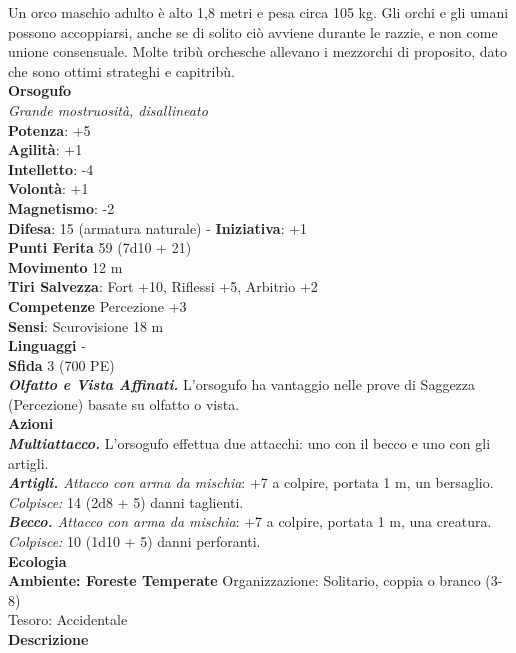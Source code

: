 \begin{multicols}{2}
Un orco maschio adulto è alto 1,8 metri e pesa circa 105 kg. Gli orchi e gli umani possono accoppiarsi, anche se di solito ciò avviene durante le razzie, e non come unione consensuale. Molte tribù orchesche allevano i mezzorchi di proposito, dato che sono ottimi strateghi e capitribù.\\


\medskip\textbf{Orsogufo}\\
\emph{Grande mostruosità, disallineato}\\
\textbf{Potenza}: +5\\
\textbf{Agilità}: +1\\
\textbf{Intelletto}: -4\\
\textbf{Volontà}: +1\\
\textbf{Magnetismo}: -2\\
\textbf{Difesa}: 15 (armatura naturale) - \textbf{Iniziativa}: +1\\
\textbf{Punti Ferita} 59 (7d10 + 21)\\
\textbf{Movimento} 12 m\\
\textbf{Tiri Salvezza}: Fort +10, Riflessi +5, Arbitrio +2\\
\textbf{Competenze} Percezione +3\\
\textbf{Sensi}: Scurovisione 18 m\\
\textbf{Linguaggi} -\\
\textbf{Sfida} 3 (700 PE)\smallskip\\
\emph{\textbf{Olfatto e Vista Affinati.}} L'orsogufo ha vantaggio nelle prove di Saggezza (Percezione) basate su olfatto o vista.\\
\smallskip\textbf{Azioni}\\
\emph{\textbf{Multiattacco.}} L'orsogufo effettua due attacchi: uno con il becco e uno con gli artigli.\\
\emph{\textbf{Artigli.} Attacco con arma da mischia}: +7 a colpire, portata 1 m, un bersaglio.\\
\emph{Colpisce:} 14 (2d8 + 5) danni taglienti.\\
\emph{\textbf{Becco.} Attacco con arma da mischia}: +7 a colpire, portata 1 m, una creatura.\\
\emph{Colpisce:} 10 (1d10 + 5) danni perforanti.\\
\textbf{Ecologia}\\
\textbf{Ambiente: Foreste Temperate}
Organizzazione: Solitario, coppia o branco (3-8)\\
Tesoro: Accidentale\\
\textbf{Descrizione}\\

\end{multicols}
